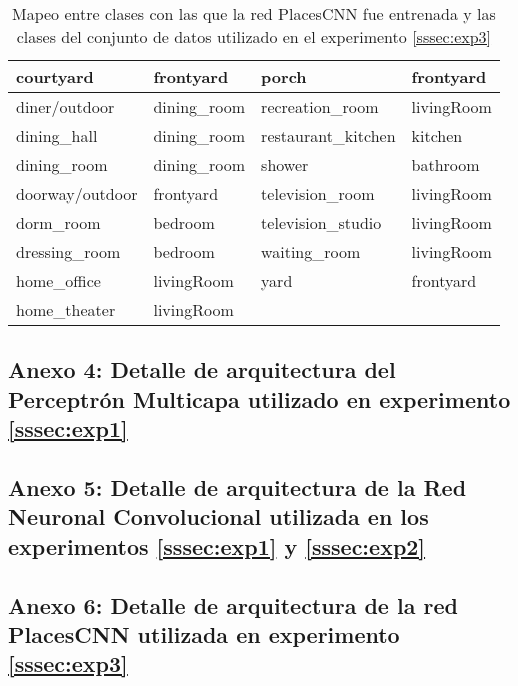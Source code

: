 \begin{table}[h!]
\begin{tabular}{||l|l||l|l||}
		courtyard &    frontyard &               porch &   frontyard \\
		\midrule
		diner/outdoor &  dining\_room &     recreation\_room &  livingRoom \\
		\midrule
		dining\_hall &  dining\_room &  restaurant\_kitchen &     kitchen \\
		\midrule
		dining\_room &  dining\_room &              shower &    bathroom \\
		\midrule
		doorway/outdoor &    frontyard &     television\_room &  livingRoom \\
		\midrule
		dorm\_room &      bedroom &   television\_studio &  livingRoom \\
		\midrule
		dressing\_room &      bedroom &        waiting\_room &  livingRoom \\
		\midrule
		home\_office &   livingRoom &                yard &   frontyard \\
		\midrule
		home\_theater &  livingRoom & & \\
		\bottomrule
	\end{tabular}
	\caption{Mapeo entre clases con las que la red PlacesCNN fue entrenada y las clases del conjunto de datos utilizado en el experimento \ref{sssec:exp3}}
\label{anexo:exp3:mapping}
\end{table}



\subsection{Anexo 4: Detalle de arquitectura del Perceptrón Multicapa utilizado en experimento \ref{sssec:exp1}}\label{ssec:anexo4}

\subsection{Anexo 5: Detalle de arquitectura de la Red Neuronal Convolucional utilizada en los experimentos \ref{sssec:exp1} y \ref{sssec:exp2}}\label{ssec:anexo5}

\subsection{Anexo 6: Detalle de arquitectura de la red PlacesCNN utilizada en experimento \ref{sssec:exp3}}\label{ssec:anexo6}

